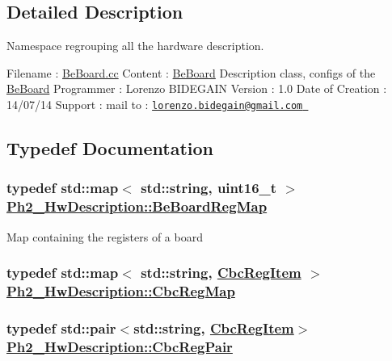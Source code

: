 \subsection{Detailed Description}
Namespace regrouping all the hardware description. 

Filename : \hyperlink{_be_board_8cc}{Be\-Board.cc} Content : \hyperlink{class_ph2___hw_description_1_1_be_board}{Be\-Board} Description class, configs of the \hyperlink{class_ph2___hw_description_1_1_be_board}{Be\-Board} Programmer : Lorenzo BIDEGAIN Version : 1.0 Date of Creation : 14/07/14 Support : mail to : \href{mailto:lorenzo.bidegain@gmail.com}\tt{lorenzo.bidegain@gmail.com} 



\subsection{Typedef Documentation}
\hypertarget{namespace_ph2___hw_description_2e13fb82c8ed98154c60f9d0f8467d72}{
\subsubsection[BeBoardRegMap]{\setlength{\rightskip}{0pt plus 5cm}typedef std::map$<$ std::string, uint16\_\-t $>$ \hyperlink{namespace_ph2___hw_description_2e13fb82c8ed98154c60f9d0f8467d72}{Ph2\_\-Hw\-Description::Be\-Board\-Reg\-Map}}}
\label{namespace_ph2___hw_description_2e13fb82c8ed98154c60f9d0f8467d72}


Map containing the registers of a board \hypertarget{namespace_ph2___hw_description_9a23b373068f169aa67ca1d22c9a6001}{
\subsubsection[CbcRegMap]{\setlength{\rightskip}{0pt plus 5cm}typedef std::map$<$ std::string, \hyperlink{struct_ph2___hw_description_1_1_cbc_reg_item}{Cbc\-Reg\-Item} $>$ \hyperlink{namespace_ph2___hw_description_9a23b373068f169aa67ca1d22c9a6001}{Ph2\_\-Hw\-Description::Cbc\-Reg\-Map}}}
\label{namespace_ph2___hw_description_9a23b373068f169aa67ca1d22c9a6001}


\hypertarget{namespace_ph2___hw_description_78856413327152e693dceca249188d11}{
\subsubsection[CbcRegPair]{\setlength{\rightskip}{0pt plus 5cm}typedef std::pair$<$std::string, \hyperlink{struct_ph2___hw_description_1_1_cbc_reg_item}{Cbc\-Reg\-Item}$>$ \hyperlink{namespace_ph2___hw_description_78856413327152e693dceca249188d11}{Ph2\_\-Hw\-Description::Cbc\-Reg\-Pair}}}
\label{namespace_ph2___hw_description_78856413327152e693dceca249188d11}


